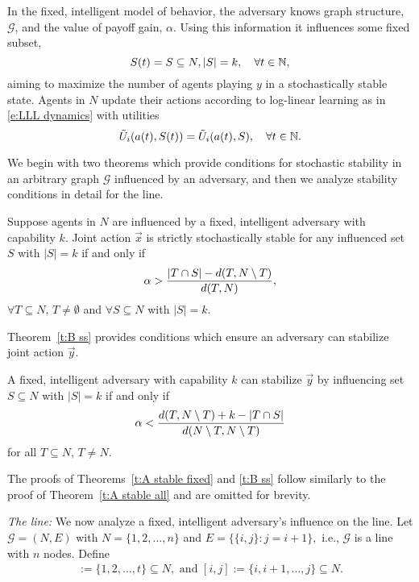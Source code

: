 In the fixed, intelligent model of behavior, the adversary knows graph structure, $\mathcal{G}$, and the value of payoff gain, $\alpha.$ Using this information it influences some fixed subset, 
$$S(t) = S\subseteq N, |S| = k,\quad \forall t\in\mathbb{N},$$
aiming to maximize the number of agents playing $y$ in a stochastically stable state. Agents in $N$ update their actions according to log-linear learning as in \eqref{e:LLL dynamics} with utilities $$\tilde{U}_i(a(t),S(t)) = \tilde{U}_i(a(t),S),\quad\forall t\in\mathbb{N}.$$ 

We begin with two theorems which provide conditions for stochastic stability in an arbitrary graph $\mathcal{G}$ influenced by an adversary, and then we analyze stability conditions in detail for the line.

\begin{Theorem}\label{t:A stable fixed}
Suppose agents in $N$ are influenced by a fixed, intelligent adversary with capability $k$. Joint action $\vec{x}$ is strictly stochastically stable for any influenced set $S$ with $|S| = k$ if and only if
\begin{equation}
\alpha > {|T\cap S| - d(T,N\setminus T)\over d(T,N)},%
\end{equation}
$\forall T\subseteq N,\,T\neq\emptyset$ and $\forall S\subseteq N$ with $|S| = k$.
\end{Theorem}

Theorem~\ref{t:B ss} provides conditions which ensure an adversary can stabilize joint action $\vec{y}$.%
\begin{Theorem}\label{t:B ss}
A fixed, intelligent  adversary with capability $k$ can stabilize $\vec{y}$ by influencing set $S\subseteq N$ with $|S|=k$ if and only if
\begin{equation}\label{e:above}
\alpha < {d(T,N\setminus T) + k - |T\cap S|\over d(N\setminus T,N\setminus T)}
\end{equation}
for all $T\subseteq N$, $T\neq N$.
\end{Theorem}

The proofs of Theorems~\ref{t:A stable fixed} and \ref{t:B ss} follow similarly to the proof of Theorem~\ref{t:A stable all} and are omitted for brevity.


\noindent\emph{The line:} We now analyze a fixed, intelligent adversary's influence on the line. Let $\mathcal{G} = (N,E)$ with $N = \{1,2,\ldots,n\}$ and $E = \{\{i,j\}:j = i+1\},$ i.e., $\mathcal{G}$ is a line with $n$ nodes. Define 
\begin{align*}
[t] := \{1,2,\ldots,t\}\subseteq N, \text{ and }
[i,j] := \{i,i+1,\ldots,j\}\subseteq N.
\end{align*}


